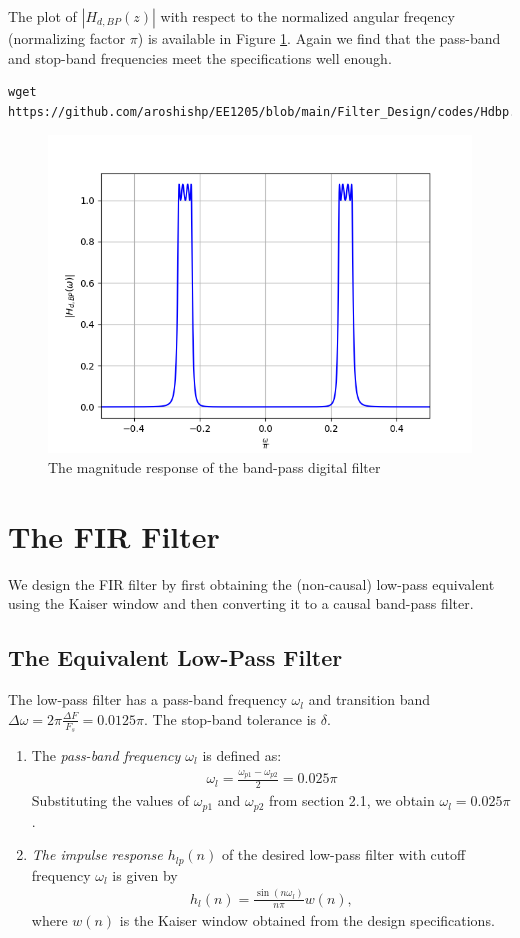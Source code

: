 \documentclass{article}
\begin{document}
The plot of $|H_{d,BP}(z)|$ with respect to the normalized angular freqency (normalizing factor $\pi$) is available in Figure \ref{fig:5}.  Again we
find that the pass-band and stop-band frequencies meet the specifications well enough.
\begin{lstlisting}[caption = {Code for Figure 5}]
wget https://github.com/aroshishp/EE1205/blob/main/Filter_Design/codes/Hdbp.py
\end{lstlisting}
\begin{figure}[!h]
    \centering
    \includegraphics[width = 0.9\columnwidth]{figs/H_dbp.png}
    \caption{The magnitude response of the band-pass digital filter}
    \label{fig:5}
\end{figure}

\section{The FIR Filter}
We design the FIR filter by first obtaining the (non-causal) low-pass equivalent using the Kaiser window
and then
converting it to a causal band-pass filter.

\subsection{The Equivalent Low-Pass Filter}
The low-pass filter has a pass-band frequency $\omega_l$ and transition band $\Delta \omega = 2\pi \frac{\Delta F}{F_s} = 0.0125\pi$.
The stop-band tolerance is $\delta$.
\begin{enumerate}
\item  The {\em pass-band frequency $\omega_l$}  is defined as:
\begin{align}
    \omega_l = \frac{\omega_{p1} - \omega_{p2}}{2} = 0.025\pi
\end{align}
Substituting the values of $\omega_{p1}$ and $\omega_{p2}$ from section 2.1, we obtain $\omega_l = 0.025\pi$.

\item {\em The impulse response $h_{lp}(n)$} of the desired low-pass filter with cutoff frequency $\omega_l$
is given by
\begin{eqnarray}
\label{firlpdef}
h_l(n) = \frac{\sin(n\omega_l)}{n\pi}w(n),
\end{eqnarray}
where $w(n)$ is the Kaiser window obtained from the design specifications.
\end{enumerate}
\end{document}
